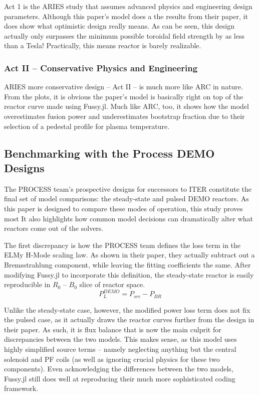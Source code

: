 Act 1 is the ARIES study that assumes advanced physics and engineering design parameters. Although this paper's model does a  the results from their paper, it does show what optimistic design really means. As can be seen, this design actually only surpasses the minimum possible toroidal field strength by as less than a Tesla! Practically, this means  reactor is barely realizable. 

\subsubsection{Act II -- Conservative Physics and Engineering}

ARIES more conservative design -- Act II -- is much more like ARC in nature. From the plots, it is obvious the paper's model is basically right on top of the reactor curve made using Fussy.jl.  Much like ARC, too, it shows how the model overestimates fusion power and underestimates bootstrap fraction due to their selection of a pedestal profile for plasma temperature.

\subsection{Benchmarking with the Process DEMO Designs}

The PROCESS team's prospective designs for successors to ITER constitute the final set of model comparisons: the steady-state and pulsed DEMO reactors. As this paper is designed to compare these modes of operation, this study proves most  It also highlights how common model decisions can dramatically alter what reactors come out of the solvers.

The first discrepancy is how the PROCESS team defines the loss term in the ELMy H-Mode scaling law. As shown in their paper, they actually subtract out a Bremsstrahlung component, while leaving the fitting coefficients the same. \cite{process} After modifying Fussy.jl to incorporate this definition, the steady-state reactor is easily reproducible in $R_0$ -- $B_0$ slice of reactor space.
\begin{equation}
	\label{eq:pl_demo}
	P_L^{DEMO} = P_{src} - P_{BR}
\end{equation}

Unlike the steady-state case, however, the modified power loss term does not fix the pulsed case, as it actually draws the reactor curves further from the design in their paper. As such, it is flux balance that is now the main culprit for discrepancies between the two models. This makes sense, as this model uses highly simplified source terms -- namely neglecting anything but the central solenoid and PF coils (as well as ignoring crucial physics for these two components). Even acknowledging the differences between the two models, Fussy.jl still does  well at reproducing their much more sophisticated coding framework. 

